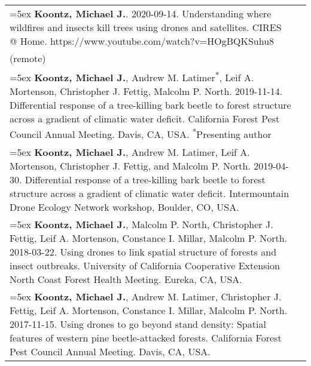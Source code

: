 \begin{longtable}{@{}>{\raggedright}p{5.25in} @{} >{\raggedleft}X@{}}
\hangindent=5ex \textbf{Koontz, Michael J.}. 2020-09-14. Understanding where wildfires and insects kill trees using drones and satellites. CIRES @ Home. https://www.youtube.com/watch?v=HOgBQKSuhu8 & 2020 \\ (remote) \tabularnewline

\hangindent=5ex \textbf{Koontz, Michael J.}, Andrew M. Latimer\textsuperscript{*}, Leif A. Mortenson, Christopher J. Fettig, Malcolm P. North. 2019-11-14. Differential response of a tree-killing bark beetle to forest structure across a gradient of climatic water deficit. California Forest Pest Council Annual Meeting. Davis, CA, USA. \newline \textsuperscript{*}Presenting author & 2019 \tabularnewline

\hangindent=5ex \textbf{Koontz, Michael J.}, Andrew M. Latimer, Leif A. Mortenson, Christopher J. Fettig, and Malcolm P. North. 2019-04-30. Differential response of a tree-killing bark beetle to forest structure across a gradient of climatic water deficit. Intermountain Drone Ecology Network workshop, Boulder, CO, USA. & 2019 \tabularnewline

\hangindent=5ex \textbf{Koontz, Michael J.}, Malcolm P. North, Christopher J. Fettig, Leif A. Mortenson, Constance I. Millar, Malcolm P. North. 2018-03-22. Using drones to link spatial structure of forests and insect outbreaks. University of California Cooperative Extension North Coast Forest Health Meeting. Eureka, CA, USA. & 2018 \tabularnewline

\hangindent=5ex \textbf{Koontz, Michael J.}, Andrew M. Latimer, Christopher J. Fettig, Leif A. Mortenson, Constance I. Millar, Malcolm P. North. 2017-11-15. Using drones to go beyond stand density: Spatial features of western pine beetle-attacked forests. California Forest Pest Council Annual Meeting. Davis, CA, USA. & 2017

\end{longtable}
